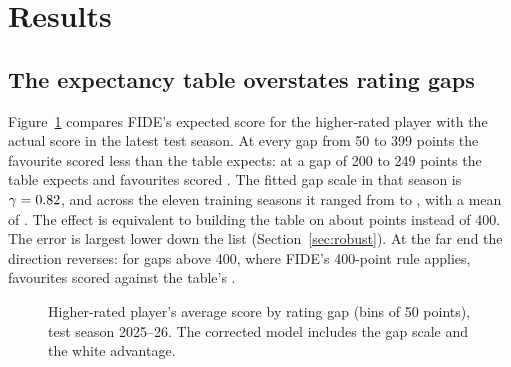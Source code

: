 \documentclass[11pt]{article}
\begin{document}
\section{Results}

\subsection{The expectancy table overstates rating gaps}

Figure~\ref{fig:calib} compares FIDE's expected score for the higher-rated player with the actual score in the latest test season. At every gap from 50 to 399 points the favourite scored less than the table expects: at a gap of 200 to 249 points the table expects \FideAtTwoHundred{} and favourites scored \ActualAtTwoHundred{}. The fitted gap scale in that season is $\gamma = 0.82$, and across the eleven training seasons it ranged from \GapScaleMin{} to \GapScaleMax{}, with a mean of \GapScaleMean{}. The effect is equivalent to building the table on about \DivisorMean{} points instead of 400. The error is largest lower down the list (Section~\ref{sec:robust}). At the far end the direction reverses: for gaps above 400, where FIDE's 400-point rule applies, favourites scored \ActualAtFourHundred{} against the table's \FideAtFourHundred{}.

\begin{figure}[htbp]
\centering
{}
\caption{Higher-rated player's average score by rating gap (bins of 50 points), test season 2025--26. The corrected model includes the gap scale and the white advantage.}
\label{fig:calib}
\end{figure}
\end{document}
